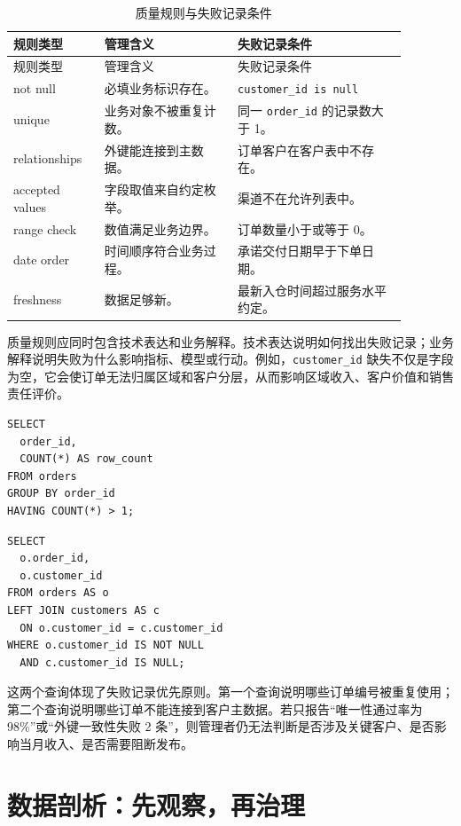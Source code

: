 \documentclass[UTF8,fontset=fandol,openany,zihao=-4]{ctexbook}
\begin{document}
\begin{longtable}{>{\raggedright\arraybackslash}p{0.20\linewidth}>{\raggedright\arraybackslash}p{0.30\linewidth}>{\raggedright\arraybackslash}p{0.38\linewidth}}
\caption{质量规则与失败记录条件}\\
\toprule
规则类型 & 管理含义 & 失败记录条件\\
\midrule
\endfirsthead
\toprule
规则类型 & 管理含义 & 失败记录条件\\
\midrule
\endhead
not null & 必填业务标识存在。 & \texttt{customer\_id is null}\\
unique & 业务对象不被重复计数。 & 同一 \texttt{order\_id} 的记录数大于 1。\\
relationships & 外键能连接到主数据。 & 订单客户在客户表中不存在。\\
accepted values & 字段取值来自约定枚举。 & 渠道不在允许列表中。\\
range check & 数值满足业务边界。 & 订单数量小于或等于 0。\\
date order & 时间顺序符合业务过程。 & 承诺交付日期早于下单日期。\\
freshness & 数据足够新。 & 最新入仓时间超过服务水平约定。\\
\bottomrule
\end{longtable}

质量规则应同时包含技术表达和业务解释。技术表达说明如何找出失败记录；业务解释说明失败为什么影响指标、模型或行动。例如，\texttt{customer\_id} 缺失不仅是字段为空，它会使订单无法归属区域和客户分层，从而影响区域收入、客户价值和销售责任评价。

\begin{lstlisting}[style=sqlstyle,caption={主键重复失败记录查询}]
SELECT
  order_id,
  COUNT(*) AS row_count
FROM orders
GROUP BY order_id
HAVING COUNT(*) > 1;
\end{lstlisting}

\begin{lstlisting}[style=sqlstyle,caption={客户外键失败记录查询}]
SELECT
  o.order_id,
  o.customer_id
FROM orders AS o
LEFT JOIN customers AS c
  ON o.customer_id = c.customer_id
WHERE o.customer_id IS NOT NULL
  AND c.customer_id IS NULL;
\end{lstlisting}

这两个查询体现了失败记录优先原则。第一个查询说明哪些订单编号被重复使用；第二个查询说明哪些订单不能连接到客户主数据。若只报告“唯一性通过率为 98\%”或“外键一致性失败 2 条”，则管理者仍无法判断是否涉及关键客户、是否影响当月收入、是否需要阻断发布。

\section{数据剖析：先观察，再治理}
\end{document}
